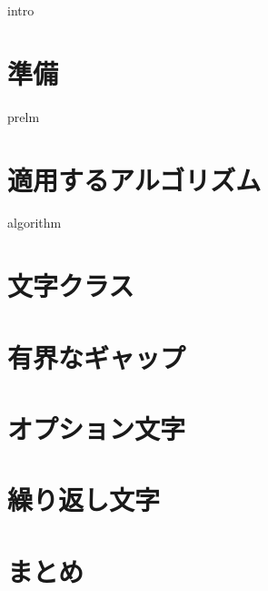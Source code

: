 \documentclass[12pt, dvipdfmx]{beamer}
\begin{document}
\maketitle
{}

{intro}
\section{準備}
{prelm}
\section{適用するアルゴリズム}
{algorithm}
\section{文字クラス}
%
\section{有界なギャップ}
%
\section{オプション文字}
%
\section{繰り返し文字}
%
\section{まとめ}
%
\end{document}
